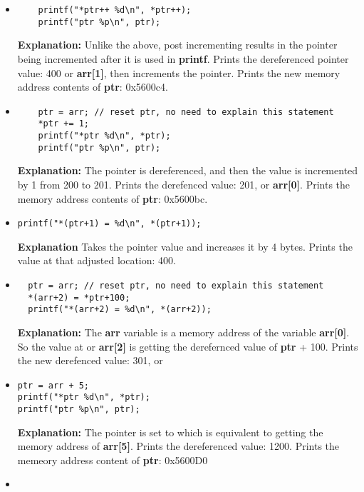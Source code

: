 \documentclass{article}
\begin{document}
\begin{itemize}
\begin{lstlisting}
    // fun with printf repeat last couple of commands
    printf("*++ptr %d\n", *++ptr);
    printf("ptr %p\n", ptr);
  \end{lstlisting}
  \textbf{Explanation:} Due to the functionality of \textbf{++} and the previously stated functionality of \textbf{*}, the pointer is incremented before being used in \textbf{printf}. Prints the value that the pointer now points to: 400, or \textbf{arr[1]}. Prints the memeory address contents of : 0x5600c0.
  \item \begin{lstlisting}
    printf("*ptr++ %d\n", *ptr++);
    printf("ptr %p\n", ptr);
  \end{lstlisting}
  \textbf{Explanation:} Unlike the above, post incrementing results in the pointer being incremented after it is used in \textbf{printf}. Prints the dereferenced pointer value: 400 or \textbf{arr[1]}, then increments the pointer. Prints the new memory address contents of \textbf{ptr}: 0x5600c4.
  \item\begin{lstlisting}
    ptr = arr; // reset ptr, no need to explain this statement
    *ptr += 1;
    printf("*ptr %d\n", *ptr);
    printf("ptr %p\n", ptr);
\end{lstlisting}
  \textbf{Explanation:} The pointer is dereferenced, and then the value is incremented by 1 from 200 to 201. Prints the derefenced value: 201, or \textbf{arr[0]}. Prints the memory address contents of \textbf{ptr}: 0x5600bc.
  \item\begin{lstlisting}
printf("*(ptr+1) = %d\n", *(ptr+1));
\end{lstlisting}
\textbf{Explanation} Takes the pointer value and increases it by 4 bytes. Prints the value at that adjusted location: 400.
\item \begin{lstlisting}
  ptr = arr; // reset ptr, no need to explain this statement
  *(arr+2) = *ptr+100;
  printf("*(arr+2) = %d\n", *(arr+2));
\end{lstlisting}
\textbf{Explanation:} The \textbf{arr} variable is a memory address of the variable \textbf{arr[0]}. So the value at  or \textbf{arr[2]} is getting the derefernced value of \textbf{ptr} + 100. Prints the new derefenced value: 301, or 
\item \begin{lstlisting}
ptr = arr + 5;
printf("*ptr %d\n", *ptr);
printf("ptr %p\n", ptr);
\end{lstlisting}
\textbf{Explanation:} The pointer is set to  which is equivalent to getting the memory address of \textbf{arr[5]}. Prints the dereferenced value: 1200. Prints the memeory address content of \textbf{ptr}: 0x5600D0
\item \begin{lstlisting}
  

\end{lstlisting}
\end{itemize}
\end{document}
